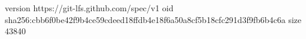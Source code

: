 version https://git-lfs.github.com/spec/v1
oid sha256:cbb6f0be42f9b4ce59cdeed18ffdb4e18f6a50a8cf5b18cfc291d3f9fb6b4c6a
size 43840
